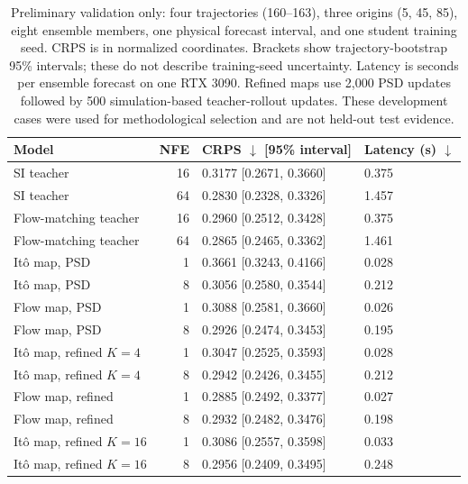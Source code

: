 \begin{table}[t]
\caption{Preliminary validation only: four trajectories (160--163), three origins (5, 45, 85), eight ensemble members, one physical forecast interval, and one student training seed. CRPS is in normalized coordinates. Brackets show trajectory-bootstrap 95\% intervals; these do not describe training-seed uncertainty. Latency is seconds per ensemble forecast on one RTX 3090. Refined maps use 2,000 PSD updates followed by 500 simulation-based teacher-rollout updates. These development cases were used for methodological selection and are not held-out test evidence.}
\label{tab:validation-development}
\centering
\begin{tabular}{lrll}
\toprule
Model & NFE & CRPS $\downarrow$ [95\% interval] & Latency (s) $\downarrow$ \\
\midrule
SI teacher & 16 & 0.3177 [0.2671, 0.3660] & 0.375 \\
SI teacher & 64 & 0.2830 [0.2328, 0.3326] & 1.457 \\
Flow-matching teacher & 16 & 0.2960 [0.2512, 0.3428] & 0.375 \\
Flow-matching teacher & 64 & 0.2865 [0.2465, 0.3362] & 1.461 \\
It\^o map, PSD & 1 & 0.3661 [0.3243, 0.4166] & 0.028 \\
It\^o map, PSD & 8 & 0.3056 [0.2580, 0.3544] & 0.212 \\
Flow map, PSD & 1 & 0.3088 [0.2581, 0.3660] & 0.026 \\
Flow map, PSD & 8 & 0.2926 [0.2474, 0.3453] & 0.195 \\
It\^o map, refined $K=4$ & 1 & 0.3047 [0.2525, 0.3593] & 0.028 \\
It\^o map, refined $K=4$ & 8 & 0.2942 [0.2426, 0.3455] & 0.212 \\
Flow map, refined & 1 & 0.2885 [0.2492, 0.3377] & 0.027 \\
Flow map, refined & 8 & 0.2932 [0.2482, 0.3476] & 0.198 \\
It\^o map, refined $K=16$ & 1 & 0.3086 [0.2557, 0.3598] & 0.033 \\
It\^o map, refined $K=16$ & 8 & 0.2956 [0.2409, 0.3495] & 0.248 \\
\bottomrule
\end{tabular}
\end{table}
